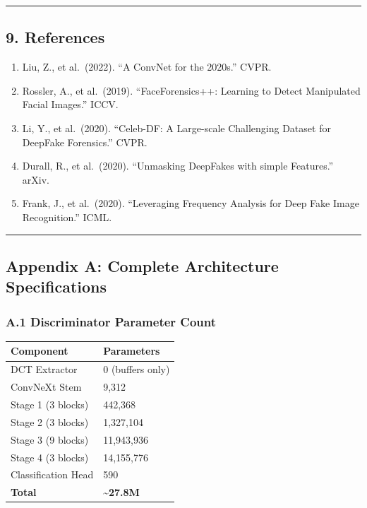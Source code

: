 \begin{center}\rule{0.5\linewidth}{0.5pt}\end{center}

\subsection{9. References}\label{references}

\begin{enumerate}
\def\labelenumi{\arabic{enumi}.}
\tightlist
\item
  Liu, Z., et al.~(2022). ``A ConvNet for the 2020s.'' CVPR.
\item
  Rossler, A., et al.~(2019). ``FaceForensics++: Learning to Detect
  Manipulated Facial Images.'' ICCV.
\item
  Li, Y., et al.~(2020). ``Celeb-DF: A Large-scale Challenging Dataset
  for DeepFake Forensics.'' CVPR.
\item
  Durall, R., et al.~(2020). ``Unmasking DeepFakes with simple
  Features.'' arXiv.
\item
  Frank, J., et al.~(2020). ``Leveraging Frequency Analysis for Deep
  Fake Image Recognition.'' ICML.
\end{enumerate}

\begin{center}\rule{0.5\linewidth}{0.5pt}\end{center}

\subsection{Appendix A: Complete Architecture
Specifications}\label{appendix-a-complete-architecture-specifications}

\subsubsection{A.1 Discriminator Parameter
Count}\label{a.1-discriminator-parameter-count}

\begin{longtable}[]{@{}ll@{}}
\toprule\noalign{}
Component & Parameters \\
\midrule\noalign{}
\endhead
\bottomrule\noalign{}
\endlastfoot
DCT Extractor & 0 (buffers only) \\
ConvNeXt Stem & 9,312 \\
Stage 1 (3 blocks) & 442,368 \\
Stage 2 (3 blocks) & 1,327,104 \\
Stage 3 (9 blocks) & 11,943,936 \\
Stage 4 (3 blocks) & 14,155,776 \\
Classification Head & 590 \\
\textbf{Total} & \textbf{\textasciitilde27.8M} \\
\end{longtable}

